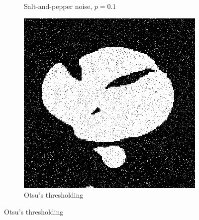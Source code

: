 \documentclass[UTF8]{ctexart}
\begin{document}
\begin{figure}[htbp]
\begin{subfigure}{0.3\textwidth}
        \caption{Salt-and-pepper noise, $p=0.1$}
    \end{subfigure}%
    \hfill
    \begin{subfigure}{0.3\textwidth}
        \centering
        \includegraphics[width=0.8\linewidth]{heart_otsu.png}
        \caption{Otsu's thresholding}
    \end{subfigure}


\end{figure}
\end{document}
